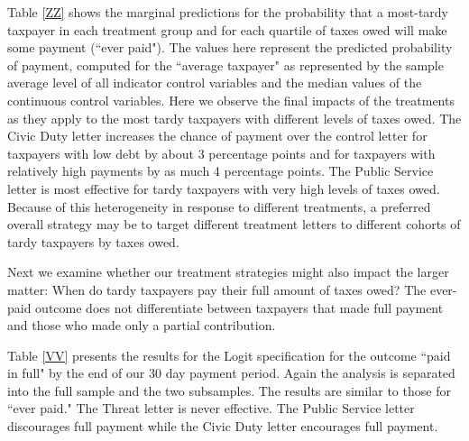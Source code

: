 \documentclass[12pt,titlepage]{article}
\begin{document}
Table \ref{ZZ} shows the marginal predictions for the probability that
a most-tardy taxpayer in each treatment group and for each quartile of taxes owed
will make some payment (``ever paid").  The values here represent the
predicted probability of payment, computed for the ``average taxpayer"
as represented by the sample average level of all indicator control
variables and the median values of the continuous control variables.
Here we observe the final impacts of the treatments as they apply to
the most tardy taxpayers with different levels of taxes owed.  The Civic Duty letter
increases the chance of payment over the control letter for taxpayers
with low debt by about 3 percentage points and for taxpayers with
relatively high payments by as much 4 percentage points.  The Public 
Service letter is most effective for tardy taxpayers with very high 
levels of taxes owed.  Because of this heterogeneity in response to 
different treatments, a preferred overall strategy may be to target 
different treatment letters to different cohorts of tardy 
taxpayers by taxes owed.  

Next we examine whether our treatment strategies might also impact the
larger matter: When do tardy taxpayers pay their full amount of taxes owed?
The ever-paid outcome does not differentiate between taxpayers that
made full payment and those who made only a partial contribution.

Table \ref{VV} presents the results for the Logit specification for
the outcome ``paid in full" by the end of our 30 day payment period.
Again the analysis is separated into the full sample and the
two subsamples.  The results are similar to those for ``ever paid."
The Threat letter is never effective.  The Public Service letter
discourages full payment while the Civic Duty letter encourages full
payment.
\end{document}
